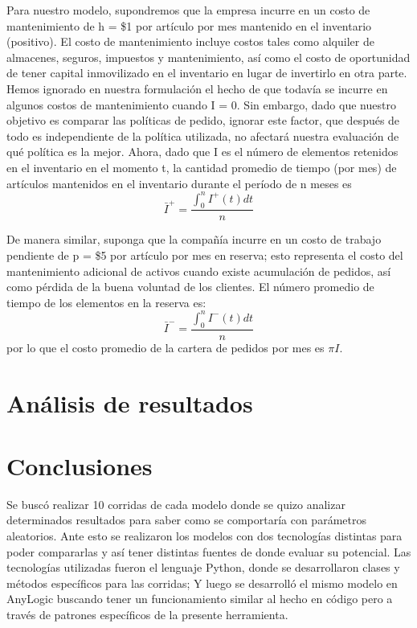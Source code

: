 Para nuestro modelo, supondremos que la empresa incurre en un costo de mantenimiento de
h = \$1 por artículo por mes mantenido en el inventario (positivo).
El costo de mantenimiento incluye costos tales como alquiler de almacenes, seguros, impuestos
y mantenimiento, así como el costo de oportunidad de tener capital inmovilizado en el inventario
en lugar de invertirlo en otra parte.
Hemos ignorado en nuestra formulación el hecho de que todavía se incurre en algunos costos de
mantenimiento cuando I = 0.
Sin embargo, dado que nuestro objetivo es comparar las políticas de pedido, ignorar este factor,
que después de todo es independiente de la política utilizada, no afectará nuestra evaluación
de qué política es la mejor.
Ahora, dado que I es el número de elementos retenidos en el inventario en el momento t,
la cantidad promedio de tiempo (por mes) de artículos mantenidos en el inventario durante el
período de n meses es
\begin{equation}
  \label{eq:equation11}
  \bar{I}^{+}=\frac{\int_{0}^{n}I^{+}(t)dt}{n}
\end{equation}

De manera similar, suponga que la compañía incurre en un costo de trabajo pendiente de p = \$5 por
artículo por mes en reserva;
esto representa el costo del mantenimiento adicional de activos cuando existe acumulación de pedidos,
así como pérdida de la buena voluntad de los clientes.
El número promedio de tiempo de los elementos en la reserva es:
\begin{equation}
    \label{eq:equation12}
    \bar{I}^{-}=\frac{\int_{0}^{n}I^{-}(t)dt}{n}
\end{equation}
por lo que el costo promedio de la cartera de pedidos por mes es $\pi I$.


\section{Análisis de resultados}
    
    
    
    


\section{Conclusiones}
\label{sec:conclusiones}
Se buscó realizar 10 corridas de cada modelo donde se quizo analizar determinados resultados para saber como se comportaría con parámetros aleatorios.
Ante esto se realizaron los modelos con dos tecnologías distintas para poder compararlas y así tener distintas fuentes de donde evaluar su potencial.
Las tecnologías utilizadas fueron el lenguaje Python, donde se desarrollaron clases y métodos específicos para las corridas;
Y luego se desarrolló el mismo modelo en AnyLogic buscando tener un funcionamiento similar al hecho en código pero a través de patrones específicos de la presente herramienta.

